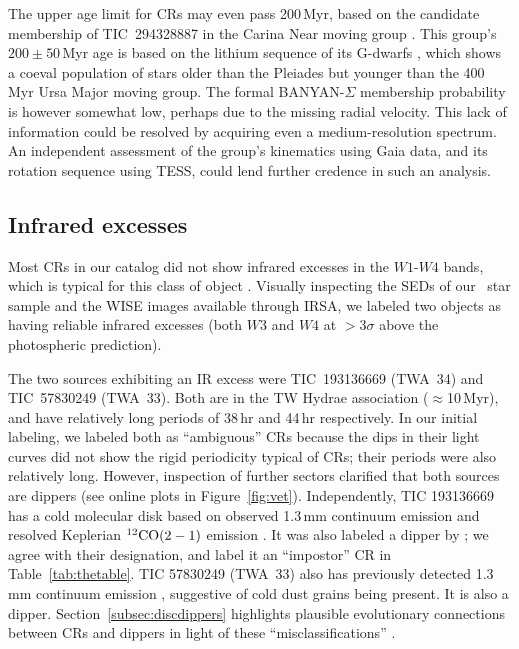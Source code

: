 \documentclass[11pt,twocolumn,tighten]{aastex63}
\begin{document}
The upper age limit for CRs may even pass 200\,Myr, based on the
candidate membership of TIC~294328887 in the Carina Near moving group
\citep{2006ApJ...649L.115Z}.  This group's $200 \pm 50$\,Myr age is
based on the lithium sequence of its G-dwarfs
\citep{2006ApJ...649L.115Z}, which shows a coeval population of stars
older than the Pleiades but younger than the 400\,Myr Ursa Major
moving group.  The formal BANYAN-$\Sigma$ membership probability is
however somewhat low, perhaps due to the missing radial velocity.
This lack of information could be resolved by acquiring even a
medium-resolution spectrum.  An independent assessment of the group's
kinematics using Gaia data, and its rotation sequence using TESS,
could lend further credence in such an analysis.


\subsection{Infrared excesses}
\label{subsec:irexcess}

Most CRs in our catalog did not show infrared excesses in the
$W1$-$W4$ bands, which is typical for this class of object
\citep{2017AJ....153..152S}.  Visually inspecting the SEDs of our
\nallcands\ star sample and the WISE images available through IRSA, we
labeled two objects as having reliable infrared excesses (both $W3$
and $W4$ at $>$3$\sigma$ above the photospheric prediction).

The two sources exhibiting an IR excess were TIC~193136669 (TWA~34)
and TIC~57830249 (TWA~33).  Both are in the TW Hydrae association
($\approx$10\,Myr), and have relatively long periods of 38\,hr and
44\,hr respectively.  In our initial labeling, we labeled both as
``ambiguous'' CRs because the dips in their light curves did not show
the rigid periodicity typical of CRs;  their periods were also
relatively long.  However, inspection of further sectors clarified
that both sources are dippers (see online plots in
Figure~\ref{fig:vet}).  Independently, TIC 193136669 has a cold
molecular disk based on observed 1.3\,mm continuum emission and
resolved Keplerian $^{12}{\rm CO}(2-1)$ emission
\citep{2015A&A...582L...5R}.  It was also labeled a dipper by
\citet{2022ApJS..263...14C}; we agree with their designation, and
label it an ``impostor'' CR in Table~\ref{tab:thetable}.  TIC
57830249 (TWA~33) also has previously detected 1.3\,mm continuum
emission \citep{2015A&A...582L...5R}, suggestive of cold dust grains
being present.  It is also a dipper.  Section~\ref{subsec:discdippers}
highlights plausible evolutionary connections between CRs and dippers
in light of these ``misclassifications'' .
\end{document}
